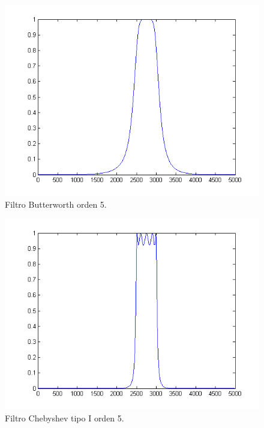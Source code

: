 \documentclass[10pt,a4paper,final]{article}
\begin{document}
\begin{figure}[h!]
\centering
  \caption{Filtro Butterworth orden 5.}
  \label{fig:res120}
  \includegraphics[scale=0.5]{fig16.png}
    
\end{figure}

\begin{figure}[h!]
\centering
  \caption{Filtro Chebyshev tipo I orden 5.}
  \label{fig:res120}
  \includegraphics[scale=0.5]{fig17.png}
    
\end{figure}
\end{document}
